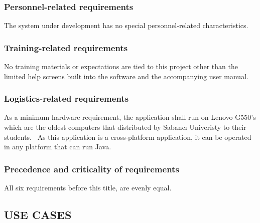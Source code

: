 \documentclass[twoside,letterpaper]{article}
\begin{document}
\subsubsection[Personnel{}-related
requirements]{\rmfamily\bfseries\color{black}
Personnel-related requirements}

{\color{black}
The system under development has no special personnel-related
characteristics. }

\subsubsection[Training{}-related
requirements]{\rmfamily\bfseries\color{black}
Training-related requirements}

{\color{black}
No training materials or expectations are tied to this project other
than the limited help screens built into the software and the
accompanying user manual.}

\subsubsection[Logistics{}-related
requirements]{\rmfamily\bfseries\color{black}
Logistics-related requirements}

{\color{black}
As a minimum hardware requirement, the application shall run on Lenovo G550{\textquoteright}s which are the oldest computers that distributed by Sabanc\i{} Univeristy to their students. \ As this application is a cross-platform application, it can be operated in any platform that can run Java.}

\subsubsection[Precedence and criticality of
requirements]{\rmfamily\bfseries\color{black}
Precedence and criticality of requirements}

{\color{black}
All six requirements before this title, are evenly equal.}

\subsection[USE CASES]{\rmfamily\bfseries\color{black}
USE CASES}
\end{document}
